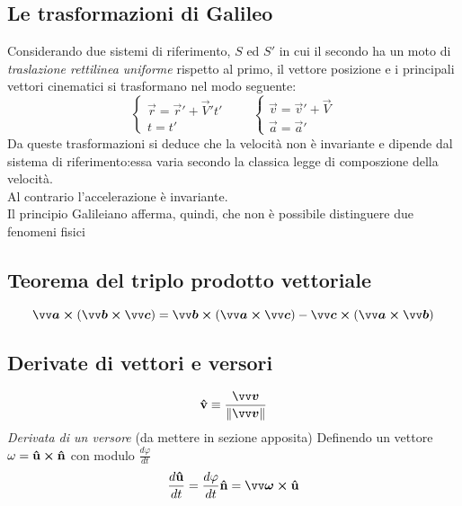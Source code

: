 \subsection*{Le trasformazioni di Galileo}
Considerando due sistemi di riferimento, $S $ ed $S'$ in cui il secondo ha un moto 
di \emph{traslazione rettilinea uniforme} rispetto al primo, il vettore posizione e i principali
vettori cinematici si trasformano nel modo seguente:
\[
\begin{cases}
     \vec{r} = \vec{r}' + \vec{V}'  t' \\
     t = t'
\end{cases} 
\qquad 
\begin{cases}
     \vec{v} = \vec{v}' + \vec{V} \\
     \vec{a} = \vec{a}'
\end{cases}    
\]
Da queste trasformazioni si deduce che la velocità non è invariante e dipende dal sistema di 
riferimento:essa varia secondo la classica legge di composzione della velocità. \\
Al contrario l'accelerazione è invariante. \\
Il principio Galileiano afferma, quindi, che non è possibile distinguere due fenomeni fisici 


\subsection*{Teorema del triplo prodotto vettoriale}
\[
 \vec{a} \cross (\vec{b} \cross \vec{c}) = \vec{b} \cross (\vec{a} \cross \vec{c}) -
 \vec{c} \cross (\vec{a} \cross \vec{b})
\]
\subsection*{Derivate di vettori e versori }
\[
     \v{v} \equiv \frac{\vec{v}}{\Norm{v}}
\]
\emph{Derivata di un versore} (da mettere in sezione apposita)
Definendo un vettore $\omega = \mathbf{\hat{u}} \cross \mathbf{\hat{n}}$ con modulo $\frac{d \varphi}{dt}$
\[
 \frac{d\v{u}}{dt} = \frac{d \varphi}{dt} \v{n} = \vec{\omega} \cross \v{u}     
\]

